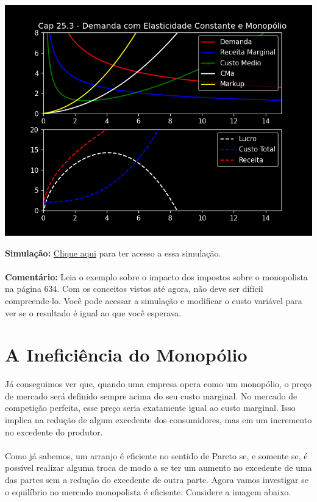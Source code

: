\documentclass[a4paper,11pt,oneside]{book}
\theoremstyle{definition}
\theoremstyle{break}
\begin{document}
\begin{center}
\includegraphics[scale=0.7]{cap25_3-demanda_ces_e_monopolio.png}
\end{center}

\textbf{Simulação:} \href{https://colab.research.google.com/drive/1MRJb9DZ7n_Hz2Kp9ng8K7pOcb1DTy_u5?usp=sharing}{Clique aqui} para ter acesso a essa simulação.
\\
\\
\textbf{Comentário:} Leia o exemplo sobre o impacto dos impostos sobre o monopolista na página 634. Com os conceitos vistos até agora, não deve ser difícil compreende-lo. Você pode acessar a simulação e modificar o custo variável para ver se o resultado é igual ao que você esperava.

\section{A Ineficiência do Monopólio}

Já conseguimos ver que, quando uma empresa opera como um monopólio, o preço de mercado será definido sempre acima do seu custo marginal. No mercado de competição perfeita, esse preço seria exatamente igual ao custo marginal. Isso implica na redução de algum excedente dos consumidores, mas em um incremento no excedente do produtor.
\\
\\
Como já sabemos, um arranjo é eficiente no sentido de Pareto se, e somente se, é possível realizar alguma troca de modo a se ter um aumento no excedente de uma das partes sem a redução do excedente de outra parte. Agora vamos investigar se o equilíbrio no mercado monopolista é eficiente. Considere a imagem abaixo.
\end{document}
